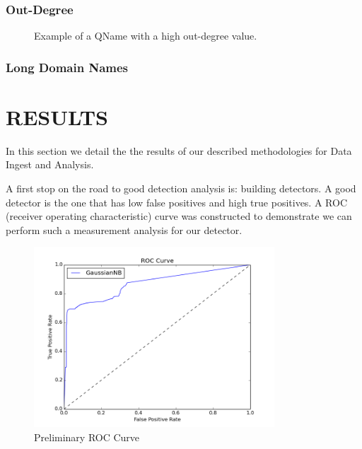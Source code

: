 \documentclass{acm_proc_article-sp}
\begin{document}
\subsubsection{Out-Degree}

\begin{figure}
\centering
    \usetikzlibrary{arrows.meta}
\caption{
Example of a QName with a high out-degree value.}
\label{fig:my_label}
\end{figure}

\subsubsection{Long Domain Names}


\section{RESULTS}
In this section we detail the the results of our described methodologies for Data Ingest and Analysis.

A first stop on the road to good detection analysis is: building detectors. A good detector is the one that has low false positives and high true positives. A ROC (receiver operating characteristic) curve was constructed to demonstrate we can perform such a measurement analysis for our detector.



\begin{figure}[ht!]
\centering
\includegraphics[width=90mm]{images/ROC.png}
\caption{Preliminary ROC Curve \label{overflow}}
\end{figure}
\end{document}
